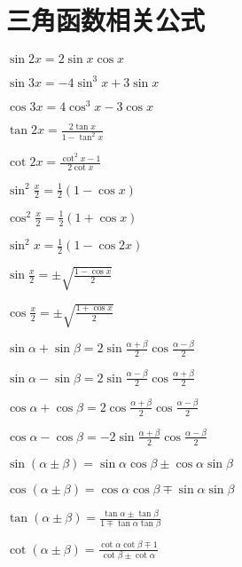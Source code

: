 \section{三角函数相关公式}

\begin{spacing}{\hangju}
    \begin{multicols}{2}
        \noindent $\displaystyle \sin{2x}=2\sin{x}\cos{x}$

        \noindent $\displaystyle \sin{3x}=-4\sin^3{x}+3\sin{x}$

        \noindent $\displaystyle \cos{3x}=4\cos^3{x}-3\cos{x}$

        \noindent $\displaystyle \tan{2x}=\frac{2\tan{x}}{1-\tan^2{x}}$

        \noindent $\displaystyle \cot{2x}=\frac{\cot^2{x}-1}{2\cot{x}}$

        \noindent $\displaystyle \sin^2{\frac{x}{2}}=\frac{1}{2}(1-\cos{x})$

        \noindent $\displaystyle \cos^2{\frac{x}{2}}=\frac{1}{2}(1+\cos{x})$

        \noindent $\displaystyle \sin^2{x}=\frac{1}{2}(1-\cos{2x})$

        \noindent $\displaystyle \sin{\frac{x}{2}}=\pm\sqrt{\frac{1-\cos{x}}{2}}$

        \noindent $\displaystyle \cos{\frac{x}{2}}=\pm\sqrt{\frac{1+\cos{x}}{2}}$

        \noindent $\displaystyle \sin{\alpha}+\sin{\beta}=2\sin{\frac{\alpha+\beta}{2}}\cos{\frac{\alpha-\beta}{2}}$

        \noindent $\displaystyle \sin{\alpha}-\sin{\beta}=2\sin{\frac{\alpha-\beta}{2}}\cos{\frac{\alpha+\beta}{2}}$

        \noindent $\displaystyle \cos{\alpha} + \cos{\beta} = 2\cos{\frac{\alpha+\beta}{2}}\cos{\frac{\alpha-\beta}{2}}$

        \noindent $\cos{\alpha} - \cos{\beta} = -2\sin{\frac{\alpha+\beta}{2}}\cos{\frac{\alpha-\beta}{2}}$

        \noindent $\displaystyle \sin{(\alpha \pm \beta)}=\sin{\alpha}\cos{\beta} \pm \cos{\alpha}\sin{\beta}$

        \noindent $\displaystyle \cos{(\alpha \pm \beta)}=\cos{\alpha}\cos{\beta} \mp \sin{\alpha}\sin{\beta}$

        \noindent $\displaystyle \tan{(\alpha \pm \beta)}=\frac{\tan{\alpha} \pm \tan{\beta}}{1 \mp \tan{\alpha}\tan{\beta}}$

        \noindent $\displaystyle \cot{(\alpha \pm \beta)}=\frac{\cot{\alpha}\cot{\beta} \mp 1}{\cot{\beta} \pm \cot{\alpha}}$


\end{multicols}
\end{spacing}
